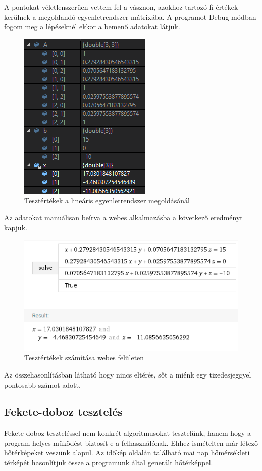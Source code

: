 			 		A pontokat véletlenszerűen vettem fel a vásznon, azokhoz tartozó fí értékek kerülnek a megoldandó egyenletrendszer mátrixába. A programot Debug módban fogom meg a lépéseknél ekkor a bemenő adatokat látjuk.
			 		\begin{figure}[ht]
			 		 	\centering
			 		 	\includegraphics[scale=1]{developer/test1.png}
			 		 	\caption{Tesztértékek a lineáris egyenletrendszer megoldásánál}
		 		 	\end{figure}
	 		 	
	 		 		Az adatokat manuálisan beírva a webes alkalmazásba a következő eredményt kapjuk.
	 		 		\begin{figure}[ht]
	 		 			\centering
	 		 			\includegraphics[scale=1]{developer/test1real.png}
	 		 			\caption{Tesztértékek számítása webes felületen}
	 		 		\end{figure}
 		 		
 		 			Az összehasonlításban látható hogy nincs eltérés, sőt a miénk egy tizedesjeggyel pontosabb számot adott. 
			 \subsection{Fekete-doboz tesztelés}
			 	Fekete-doboz teszteléssel nem konkrét algoritmusokat tesztelünk, hanem hogy a program helyes működést biztosít-e a felhasználónak. Ehhez ismételten már létező hőtérképeket veszünk alapul. Az időkép \cite{idokep} oldalán található mai nap hőmérsékleti térképét hasonlítjuk össze a programunk által generált hőtérképpel.
			 	
